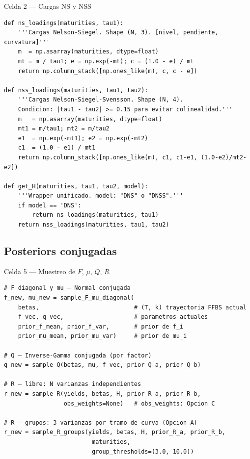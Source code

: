 \documentclass[12pt, a4paper]{article}
\theoremstyle{plain}
\theoremstyle{definition}
\theoremstyle{remark}
\begin{document}
\begin{codigocaja}{Celda 2 — Cargas NS y NSS}
\begin{lstlisting}
def ns_loadings(maturities, tau1):
    '''Cargas Nelson-Siegel. Shape (N, 3). [nivel, pendiente, curvatura]'''
    m  = np.asarray(maturities, dtype=float)
    mt = m / tau1; e = np.exp(-mt); c = (1.0 - e) / mt
    return np.column_stack([np.ones_like(m), c, c - e])

def nss_loadings(maturities, tau1, tau2):
    '''Cargas Nelson-Siegel-Svensson. Shape (N, 4).
    Condicion: |tau1 - tau2| >= 0.15 para evitar colinealidad.'''
    m   = np.asarray(maturities, dtype=float)
    mt1 = m/tau1; mt2 = m/tau2
    e1  = np.exp(-mt1); e2 = np.exp(-mt2)
    c1  = (1.0 - e1) / mt1
    return np.column_stack([np.ones_like(m), c1, c1-e1, (1.0-e2)/mt2-e2])

def get_H(maturities, tau1, tau2, model):
    '''Wrapper unificado. model: "DNS" o "DNSS".'''
    if model == 'DNS':
        return ns_loadings(maturities, tau1)
    return nss_loadings(maturities, tau1, tau2)
\end{lstlisting}
\end{codigocaja}

\subsection{Posteriors conjugadas}

\begin{codigocaja}{Celda 5 — Muestreo de $F$, $\mu$, $Q$, $R$}
\begin{lstlisting}
# F diagonal y mu — Normal conjugada
f_new, mu_new = sample_F_mu_diagonal(
    betas,                           # (T, k) trayectoria FFBS actual
    f_vec, q_vec,                    # parametros actuales
    prior_f_mean, prior_f_var,       # prior de f_i
    prior_mu_mean, prior_mu_var)     # prior de mu_i

# Q — Inverse-Gamma conjugada (por factor)
q_new = sample_Q(betas, mu, f_vec, prior_Q_a, prior_Q_b)

# R — libre: N varianzas independientes
r_new = sample_R(yields, betas, H, prior_R_a, prior_R_b,
                 obs_weights=None)   # obs_weights: Opcion C

# R — grupos: 3 varianzas por tramo de curva (Opcion A)
r_new = sample_R_groups(yields, betas, H, prior_R_a, prior_R_b,
                         maturities,
                         group_thresholds=(3.0, 10.0))
\end{lstlisting}
\end{codigocaja}
\end{document}

